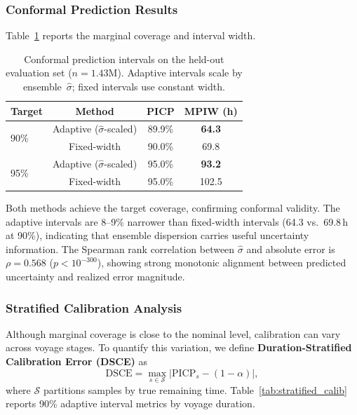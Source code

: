 \documentclass[conference]{IEEEtran}
\begin{document}
\subsubsection{Conformal Prediction Results}

Table~\ref{tab:conformal} reports the marginal coverage and interval width.

\begin{table}[t]
    \centering
    \caption{Conformal prediction intervals on the held-out evaluation set ($n=1.43$M). Adaptive intervals scale by ensemble~$\hat{\sigma}$; fixed intervals use constant width.}
    \label{tab:conformal}
    \begin{tabular}{lccc}
        \toprule
        \textbf{Target} & \textbf{Method} & \textbf{PICP} & \textbf{MPIW (h)} \\
        \midrule
        \multirow{2}{*}{90\%} & Adaptive ($\hat{\sigma}$-scaled) & 89.9\% & \textbf{64.3} \\
        & Fixed-width & 90.0\% & 69.8 \\
        \midrule
        \multirow{2}{*}{95\%} & Adaptive ($\hat{\sigma}$-scaled) & 95.0\% & \textbf{93.2} \\
        & Fixed-width & 95.0\% & 102.5 \\
        \bottomrule
    \end{tabular}
\end{table}

\noindent Both methods achieve the target coverage, confirming conformal validity. The adaptive intervals are 8--9\% narrower than fixed-width intervals (64.3 vs.\ 69.8\,h at 90\%), indicating that ensemble dispersion carries useful uncertainty information. The Spearman rank correlation between $\hat{\sigma}$ and absolute error is $\rho = 0.568$ ($p < 10^{-300}$), showing strong monotonic alignment between predicted uncertainty and realized error magnitude.

\subsubsection{Stratified Calibration Analysis}

Although marginal coverage is close to the nominal level, calibration can vary across voyage stages. To quantify this variation, we define \textbf{Duration-Stratified Calibration Error (DSCE)} as
\begin{equation}
    \text{DSCE} = \max_{s \in \mathcal{S}} \bigl|\text{PICP}_s - (1{-}\alpha)\bigr|,
\end{equation}
where $\mathcal{S}$ partitions samples by true remaining time. Table~\ref{tab:stratified_calib} reports 90\% adaptive interval metrics by voyage duration.
\end{document}
